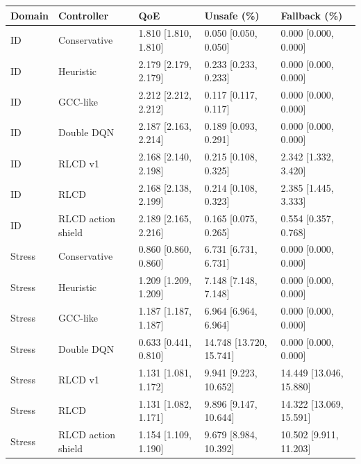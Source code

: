 \begin{tabular}{lllll}
\toprule
Domain & Controller & QoE & Unsafe (\%) & Fallback (\%) \\
\midrule
ID & Conservative & 1.810 [1.810, 1.810] & 0.050 [0.050, 0.050] & 0.000 [0.000, 0.000] \\
ID & Heuristic & 2.179 [2.179, 2.179] & 0.233 [0.233, 0.233] & 0.000 [0.000, 0.000] \\
ID & GCC-like & 2.212 [2.212, 2.212] & 0.117 [0.117, 0.117] & 0.000 [0.000, 0.000] \\
ID & Double DQN & 2.187 [2.163, 2.214] & 0.189 [0.093, 0.291] & 0.000 [0.000, 0.000] \\
ID & RLCD v1 & 2.168 [2.140, 2.198] & 0.215 [0.108, 0.325] & 2.342 [1.332, 3.420] \\
ID & RLCD & 2.168 [2.138, 2.199] & 0.214 [0.108, 0.323] & 2.385 [1.445, 3.333] \\
ID & RLCD action shield & 2.189 [2.165, 2.216] & 0.165 [0.075, 0.265] & 0.554 [0.357, 0.768] \\
Stress & Conservative & 0.860 [0.860, 0.860] & 6.731 [6.731, 6.731] & 0.000 [0.000, 0.000] \\
Stress & Heuristic & 1.209 [1.209, 1.209] & 7.148 [7.148, 7.148] & 0.000 [0.000, 0.000] \\
Stress & GCC-like & 1.187 [1.187, 1.187] & 6.964 [6.964, 6.964] & 0.000 [0.000, 0.000] \\
Stress & Double DQN & 0.633 [0.441, 0.810] & 14.748 [13.720, 15.741] & 0.000 [0.000, 0.000] \\
Stress & RLCD v1 & 1.131 [1.081, 1.172] & 9.941 [9.223, 10.652] & 14.449 [13.046, 15.880] \\
Stress & RLCD & 1.131 [1.082, 1.171] & 9.896 [9.147, 10.644] & 14.322 [13.069, 15.591] \\
Stress & RLCD action shield & 1.154 [1.109, 1.190] & 9.679 [8.984, 10.392] & 10.502 [9.911, 11.203] \\
\bottomrule
\end{tabular}
